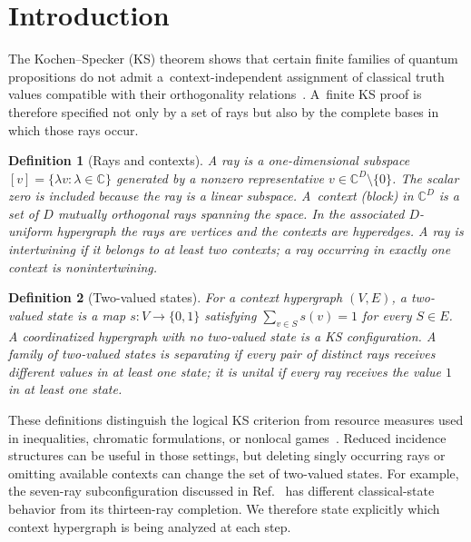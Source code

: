 \documentclass[%
  reprint,
  superscriptaddress,
  showkeys,
  amsmath,amssymb,
  aps,pra,
  longbibliography,
  floatfix,
  x11names
]{revtex4-2}
\newtheorem{definition}{Definition}
\begin{document}
\section{Introduction}

The Kochen--Specker (KS) theorem shows that certain finite families of quantum propositions do not admit a~context-independent assignment of classical truth values compatible with their orthogonality relations~\cite{kochen1}.  A~finite KS proof is therefore specified not only by a set of rays but also by the complete bases in which those rays occur.

\begin{definition}[Rays and contexts]
\label{def:contexts}
A \emph{ray} is a one-dimensional subspace
$[v]=\{\lambda v:\lambda\in\mathbb{C}\}$ generated by a
nonzero representative \ensuremath{v\in\mathbb{C}^D\setminus\{0\}}.
The scalar zero is included because the ray is a linear subspace.
A~\emph{context} (block) in $\mathbb{C}^D$ is a set of $D$ mutually orthogonal rays spanning the space.  In the associated $D$-uniform hypergraph the rays are vertices and the contexts are hyperedges.  A ray is \emph{intertwining} if it belongs to at least two contexts; a ray occurring in exactly one context is nonintertwining.
\end{definition}

\begin{definition}[Two-valued states]
\label{def:states}
For a context hypergraph $(V,E)$, a two-valued state is a map $s:V\to\{0,1\}$ satisfying $\sum_{v\in S}s(v)=1$ for every \ensuremath{S\in E}.
A coordinatized hypergraph with no two-valued state is a KS configuration.  A family of two-valued states is \emph{separating} if every pair of distinct rays receives different values in at least one state; it is \emph{unital} if every ray receives the value $1$ in at least one state.
\end{definition}

These definitions distinguish the logical KS criterion from resource measures used in inequalities, chromatic formulations, or nonlocal games~\cite{cabello:210401,2024-cabello-trandafir0,svozil-2025-color}.  Reduced incidence structures can be useful in those settings, but deleting singly occurring rays or omitting available contexts can change the set of two-valued states.  For example, the seven-ray subconfiguration discussed in Ref.~\cite[Fig.~6(a)]{pavicic-2025} has different classical-state behavior from its thirteen-ray completion.  We therefore state explicitly which context hypergraph is being analyzed at each step.
\end{document}
